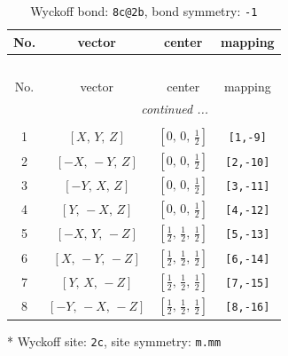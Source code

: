 \documentclass[fleqn,8pt]{jsarticle}
\begin{document}
\begin{longtable}{cccc}
\caption{Wyckoff bond: {\tt 8c@2b}, bond symmetry: {\tt -1}}
 \\
 \hline \hline
No. & vector & center & mapping \\ \hline \endfirsthead

\multicolumn{3}{l}{\tablename\ \thetable{}} \\
 \hline \hline
No. & vector & center & mapping \\ \hline \endhead

 \hline \hline
\multicolumn{3}{r}{\footnotesize\it continued ...} \\ \endfoot

 \hline \hline
\multicolumn{3}{r}{} \\ \endlastfoot

1 & $\left[ X,\, Y,\, Z \right]$ & $\left[ 0,\, 0,\, \frac{1}{2} \right]$ & {\tt [1,-9]} \\ \hline
2 & $\left[ - X,\, - Y,\, Z \right]$ & $\left[ 0,\, 0,\, \frac{1}{2} \right]$ & {\tt [2,-10]} \\ \hline
3 & $\left[ - Y,\, X,\, Z \right]$ & $\left[ 0,\, 0,\, \frac{1}{2} \right]$ & {\tt [3,-11]} \\ \hline
4 & $\left[ Y,\, - X,\, Z \right]$ & $\left[ 0,\, 0,\, \frac{1}{2} \right]$ & {\tt [4,-12]} \\ \hline
5 & $\left[ - X,\, Y,\, - Z \right]$ & $\left[ \frac{1}{2},\, \frac{1}{2},\, \frac{1}{2} \right]$ & {\tt [5,-13]} \\ \hline
6 & $\left[ X,\, - Y,\, - Z \right]$ & $\left[ \frac{1}{2},\, \frac{1}{2},\, \frac{1}{2} \right]$ & {\tt [6,-14]} \\ \hline
7 & $\left[ Y,\, X,\, - Z \right]$ & $\left[ \frac{1}{2},\, \frac{1}{2},\, \frac{1}{2} \right]$ & {\tt [7,-15]} \\ \hline
8 & $\left[ - Y,\, - X,\, - Z \right]$ & $\left[ \frac{1}{2},\, \frac{1}{2},\, \frac{1}{2} \right]$ & {\tt [8,-16]} \\
\end{longtable}
* Wyckoff site: {\tt 2c}, site symmetry: {\tt m.mm}
\renewcommand{\arraystretch}{1.2}
\end{document}
